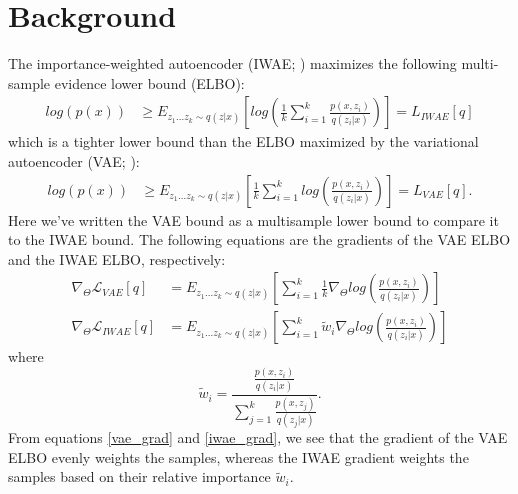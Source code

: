 \documentclass{article} %
\newcommand{\eqname}[1]{\tag*{#1}}
\begin{document}
\section{Background}
The importance-weighted autoencoder (IWAE; \cite{burda2015importance}) maximizes the following multi-sample evidence lower bound (ELBO): 
\begin{align} 
    log(p(x)) &
    \geq E_{z_{1}...z_{k} \sim q(z|x)} \left[log\left(  \frac{1}{k}  \sum_{i=1}^k \frac{p(x,z_i)}{q(z_i|x)}  \right)  \right] = L_{IWAE}[q] \label{iwae_elbo}  \eqname{(IWAE ELBO)}
\end{align}
which is a tighter lower bound than the ELBO maximized by the variational autoencoder (VAE; \cite{vae}):
\begin{align}
    log(p(x)) & \geq E_{z_{1}...z_{k} \sim q(z|x)} \left[  \frac{1}{k}\sum_{i=1}^k log\left(\frac{p(x,z_i)}{q(z_i|x)}  \right)  \right] = L_{VAE}[q]. \label{vae_elbo} \eqname{(VAE ELBO)}
\end{align}
Here we've written the VAE bound as a multisample lower bound to compare it to the IWAE bound. The following equations are the gradients of the VAE ELBO and the IWAE ELBO, respectively:
\begin{align} 
    \nabla_{\Theta} \mathcal{L}_{VAE}[q] &= E_{z_{1}...z_{k} \sim q(z|x)} \left[   \sum_{i=1}^k \frac{1}{k} \nabla_{\Theta} log\left(\frac{p(x,z_i)}{q(z_i|x)}  \right)  \right] \label{vae_grad} \\
    \nabla_{\Theta} \mathcal{L}_{IWAE}[q] &= E_{z_{1}...z_{k} \sim q(z|x)} \left[  \sum_{i=1}^k \tilde{w}_i \nabla_{\Theta} log\left(\frac{p(x,z_i)}{q(z_i|x)}  \right)  \right] \label{iwae_grad}
\end{align}
where $$\tilde{w}_i = \frac{\frac{p(x,z_i)}{q(z_i|x)}}{\sum_{j=1}^k \frac{p(x,z_j)}{q(z_j|x)}}.$$
From equations \ref{vae_grad} and \ref{iwae_grad}, we see that the gradient of the VAE ELBO evenly weights the samples, whereas the IWAE gradient weights the samples based on their relative importance $\tilde{w}_i$.




\end{document}
